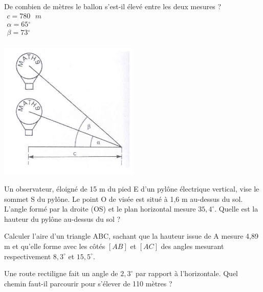 \begin{exercice}
De combien de mètres le ballon s’est-il élevé entre les deux mesures ?
$\begin{array}{l}
  c=780\text{ }m \\ 
 \alpha =65{}^\circ  \\ 
 \beta =73{}^\circ  \\ 
\end{array}$
\begin{center}
\includegraphics[width = 0.5\textwidth]{trigo/image/trigo15.png}
\end{center}
\end{exercice}

\begin{exercice}
Un observateur, éloigné de 15 m du pied E d'un pylône électrique vertical, vise le sommet S du pylône. Le point O de visée est situé à 1,6 m au-dessus du sol. L'angle formé par la droite (OS) et le plan horizontal mesure $35,4^\circ$. Quelle est la hauteur du pylône au-dessus du sol ?

\end{exercice}

\begin{exercice}
Calculer l'aire d'un triangle ABC, sachant que la hauteur issue de A mesure 4,89 m et qu'elle forme avec les côtés $\left[ AB \right]$ et $\left[ AC \right]$ des angles mesurant respectivement $8,3^\circ$ et $15,5^\circ$.

\end{exercice}

\begin{exercice}
Une route rectiligne fait un angle de $2,3^\circ$ par rapport à l'horizontale. Quel chemin faut-il parcourir pour s'élever de 110 mètres ?

\end{exercice}


